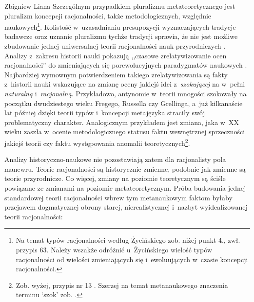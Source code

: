 \begin{artplenv}{Zbigniew Liana}
Szczególnym przypadkiem pluralizmu metateoretycznego jest pluralizm koncepcji racjonalności, także metodologicznych, względnie naukowych\footnote{Na temat typów racjonalności według Życińskiego zob. niżej punkt 4., zwł. przypis 63. Należy wszakże odróżnić u~Życińskiego wielość typów racjonalności od wielości zmieniających się i~ewoluujących w~czasie koncepcji racjonalności.}. Kolistość w~uzasadnianiu presupozycji wyznaczających tradycje badawcze oraz uznanie pluralizmu tychże tradycji sprawia, że nie jest możliwe zbudowanie jednej uniwersalnej teorii racjonalności nauk przyrodniczych
\parencite[][s.~206.226]{zycinski_teizm_1985}. %
 Analizy z~zakresu historii nauki pokazują ,,czasowe zrelatywizowanie ocen racjonalności'' do zmieniających się porewolucyjnych paradygmatów naukowych 
\parencite[][s.~196n]{zycinski_teizm_1985}. %
 Najbardziej wymownym potwierdzeniem takiego zrelatywizowania są fakty z~historii nauki wskazujące na zmianę oceny jakiejś idei z~\textit{szokującej} na w~pełni \textit{naturalną} i~\textit{racjonalną}. Przykładowo, antynomie w~teorii mnogości szokowały na początku dwudziestego wieku Fregego, Russella czy Grellinga, a~już kilkanaście lat później dzięki teorii typów i~koncepcji metajęzyka straciły swój problematyczny charakter. Analogicznym przykładem jest zmiana, jaka w~XX wieku zaszła w~ocenie metodologicznego statusu faktu wewnętrznej sprzeczności jakiejś teorii czy faktu występowania anomalii teoretycznych\footnote{Zob. wyżej, przypis nr 13%
. Szerzej na temat metanaukowego znaczenia terminu ‘szok' zob.
\parencite[][s.~163n.179n]{liana_nauka_2019_liana}.%
}.

Analizy historyczno-naukowe nie pozostawiają zatem dla racjonalisty pola manewru. Teorie racjonalności są historycznie zmienne, podobnie jak zmienne są teorie przyrodnicze. Co więcej, zmiany na poziomie teoretycznym są ściśle powiązane ze zmianami na poziomie metateoretycznym. Próba budowania jednej standardowej teorii racjonalności wbrew tym metanaukowym faktom byłaby przejawem dogmatycznej obrony starej, nierealistycznej i~nazbyt wyidealizowanej teorii racjonalności:




\end{artplenv}
